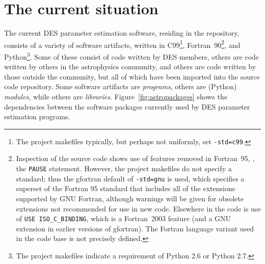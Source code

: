 \documentclass{memarticle}
\newcommand{\despipe}{\name{des-pipe}\xspace}
\begin{document}

\chapter{The current situation\label{ch:current_situation}}

The current DES parameter estimation software, residing in the
\despipe repository, consists of a variety of software
artifacts, written in C99\footnote{The project makefiles typically, but
  perhaps not uniformly, set \texttt{-std=c99}.},
Fortran~90\footnote{Inspection of the source code shows use of features
  removed in Fortran~95, \eg, the \texttt{PAUSE} statement. However, the
  project makefiles do not specify a standard; thus the gfortran default
  of \texttt{-std=gnu} is used, which specifies a superset of the
  Fortran 95 standard that includes all of the extensions supported by
  GNU Fortran, although warnings will be given for obsolete extensions
  not recommended for use in new code. Elsewhere in the code is use of
  \texttt{USE ISO\_C\_BINDING}, which is a Fortran~2003 feature (and a
  GNU extension in earlier versions of gfortran). The Fortran language
  variant used in the code base is not precisely defined.}, and
Python\footnote{The project makefiles indicate a requirement of Python
  2.6 or Python 2.7.}. Some of these consist of code written by DES
members, others are code written by others in the astrophysics
community, and others are code written by those outside the community,
but all of which have been imported into the \despipe source
code repository. Some software artifacts are \emph{programs}, others are
(Python) \emph{modules}, while others are \emph{libraries}.
Figure~\ref{fig:astropackages} shows the dependencies between the
software packages currently used by DES parameter estimation programs.
\end{document}
